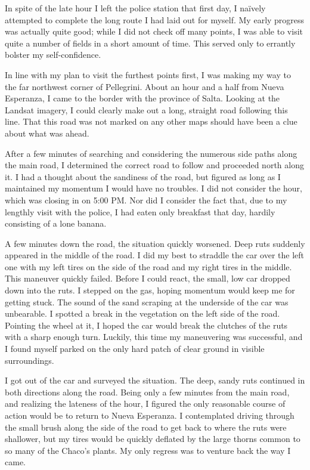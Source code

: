 In spite of the late hour I left the police station that first day, I naïvely attempted to complete the long route I had laid out for myself. My early progress was actually quite good; while I did not check off many points, I was able to visit quite a number of fields in a short amount of time. This served only to errantly bolster my self-confidence.

In line with my plan to visit the furthest points first, I was making my way to the far northwest corner of Pellegrini. About an hour and a half from Nueva Esperanza, I came to the border with the province of Salta. Looking at the Landsat imagery, I could clearly make out a long, straight road following this line. That this road was not marked on any other maps should have been a clue about what was ahead.

After a few minutes of searching and considering the numerous side paths along the main road, I determined the correct road to follow and proceeded north along it. I had a thought about the sandiness of the road, but figured as long as I maintained my momentum I would have no troubles. I did not consider the hour, which was closing in on 5:00 PM. Nor did I consider the fact that, due to my lengthly visit with the police, I had eaten only breakfast that day, hardily consisting of a lone banana.

A few minutes down the road, the situation quickly worsened. Deep ruts suddenly appeared in the middle of the road. I did my best to straddle the car over the left one with my left tires on the side of the road and my right tires in the middle. This maneuver quickly failed. Before I could react, the small, low car dropped down into the ruts. I stepped on the gas, hoping momentum would keep me for getting stuck. The sound of the sand scraping at the underside of the car was unbearable. I spotted a break in the vegetation on the left side of the road. Pointing the wheel at it, I hoped the car would break the clutches of the ruts with a sharp enough turn. Luckily, this time my maneuvering was successful, and I found myself parked on the only hard patch of clear ground in visible surroundings.

I got out of the car and surveyed the situation. The deep, sandy ruts continued in both directions along the road. Being only a few minutes from the main road, and realizing the lateness of the hour, I figured the only reasonable course of action would be to return to Nueva Esperanza. I contemplated driving through the small brush along the side of the road to get back to where the ruts were shallower, but my tires would be quickly deflated by the large thorns common to so many of the Chaco’s plants. My only regress was to venture back the way I came.


